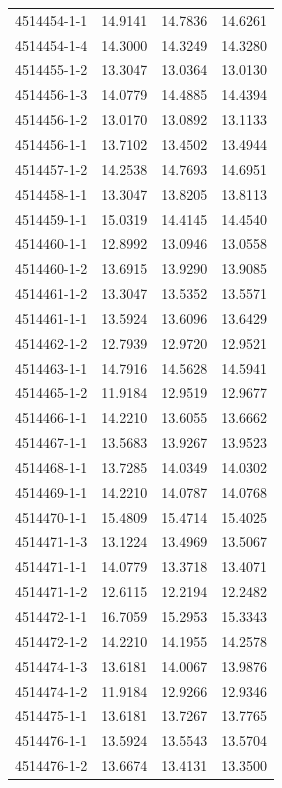 \begin{longtable}{lrrr}
4514454-1-1 & 14.9141 & 14.7836 & 14.6261 \\
4514454-1-4 & 14.3000 & 14.3249 & 14.3280 \\
4514455-1-2 & 13.3047 & 13.0364 & 13.0130 \\
4514456-1-3 & 14.0779 & 14.4885 & 14.4394 \\
4514456-1-2 & 13.0170 & 13.0892 & 13.1133 \\
4514456-1-1 & 13.7102 & 13.4502 & 13.4944 \\
4514457-1-2 & 14.2538 & 14.7693 & 14.6951 \\
4514458-1-1 & 13.3047 & 13.8205 & 13.8113 \\
4514459-1-1 & 15.0319 & 14.4145 & 14.4540 \\
4514460-1-1 & 12.8992 & 13.0946 & 13.0558 \\
4514460-1-2 & 13.6915 & 13.9290 & 13.9085 \\
4514461-1-2 & 13.3047 & 13.5352 & 13.5571 \\
4514461-1-1 & 13.5924 & 13.6096 & 13.6429 \\
4514462-1-2 & 12.7939 & 12.9720 & 12.9521 \\
4514463-1-1 & 14.7916 & 14.5628 & 14.5941 \\
4514465-1-2 & 11.9184 & 12.9519 & 12.9677 \\
4514466-1-1 & 14.2210 & 13.6055 & 13.6662 \\
4514467-1-1 & 13.5683 & 13.9267 & 13.9523 \\
4514468-1-1 & 13.7285 & 14.0349 & 14.0302 \\
4514469-1-1 & 14.2210 & 14.0787 & 14.0768 \\
4514470-1-1 & 15.4809 & 15.4714 & 15.4025 \\
4514471-1-3 & 13.1224 & 13.4969 & 13.5067 \\
4514471-1-1 & 14.0779 & 13.3718 & 13.4071 \\
4514471-1-2 & 12.6115 & 12.2194 & 12.2482 \\
4514472-1-1 & 16.7059 & 15.2953 & 15.3343 \\
4514472-1-2 & 14.2210 & 14.1955 & 14.2578 \\
4514474-1-3 & 13.6181 & 14.0067 & 13.9876 \\
4514474-1-2 & 11.9184 & 12.9266 & 12.9346 \\
4514475-1-1 & 13.6181 & 13.7267 & 13.7765 \\
4514476-1-1 & 13.5924 & 13.5543 & 13.5704 \\
4514476-1-2 & 13.6674 & 13.4131 & 13.3500 \\

\end{longtable}
